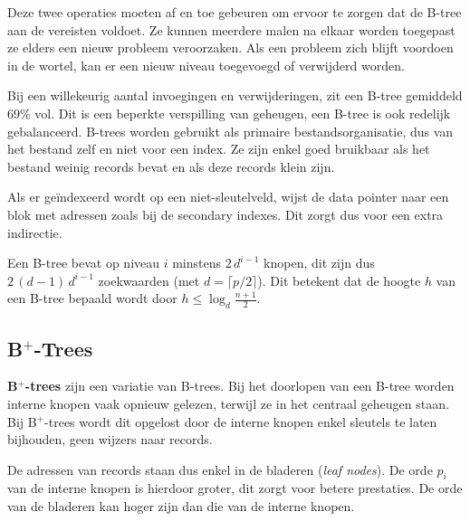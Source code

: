 Deze twee operaties moeten af en toe gebeuren om ervoor te zorgen dat de B-tree aan de vereisten voldoet. Ze kunnen meerdere malen na elkaar worden toegepast ze elders een nieuw probleem veroorzaken. Als een probleem zich blijft voordoen in de wortel, kan er een nieuw niveau toegevoegd of verwijderd worden.

\newpage
\noindent Bij een willekeurig aantal invoegingen en verwijderingen, zit een B-tree gemiddeld $69\%$ vol. Dit is een beperkte verspilling van geheugen, een B-tree is ook redelijk gebalanceerd. B-trees worden gebruikt als primaire bestandsorganisatie, dus van het bestand zelf en niet voor een index. Ze zijn enkel goed bruikbaar als het bestand weinig records bevat en als deze records klein zijn.

Als er ge\"indexeerd wordt op een niet-sleutelveld, wijst de data pointer naar een blok met adressen zoals bij de secondary indexes. Dit zorgt dus voor een extra indirectie.

Een B-tree bevat op niveau $i$ minstens $2 \, d^{i-1}$ knopen, dit zijn dus $2 \, (d-1) \, d^{i-1}$ zoekwaarden (met $d=\lceil p/2 \rceil$). Dit betekent dat de hoogte $h$ van een B-tree bepaald wordt door $h \leqslant \log_d \frac{n+1}{2}$.


\subsection[B+-trees]{B$^+$-Trees}
\textbf{B$^+$-trees} zijn een variatie van B-trees. Bij het doorlopen van een B-tree worden interne knopen vaak opnieuw gelezen, terwijl ze in het centraal geheugen staan. Bij B$^+$-trees wordt dit opgelost door de interne knopen enkel sleutels te laten bijhouden, geen wijzers naar records.

De adressen van records staan dus enkel in de bladeren (\textit{leaf nodes}). De orde $p_i$ van de interne knopen is hierdoor groter, dit zorgt voor betere prestaties. De orde van de bladeren kan hoger zijn dan die van de interne knopen.

